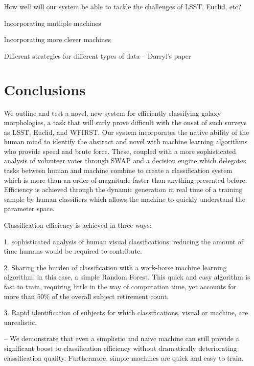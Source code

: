 \documentclass[twocolumn]{aastex6}
\begin{document}
How well will our system be able to tackle the challenges of LSST, Euclid, etc? 

Incorporating mutliple machines

Incorporating more clever machines

Different strategies for different types of data -- Darryl's paper 


\section{Conclusions}

We outline and test a novel, new system for efficiently classifying galaxy morphologies, 
a task that will surly prove difficult with the onset of such surveys as LSST, Euclid, 
and WFIRST. Our system incorporates the native ability of the human mind to identify
the abstract and novel with machine learning algorithms who provide speed and 
brute force. These, coupled with a more sophisticated analysis of volunteer votes 
through SWAP and a decision engine which delegates tasks between human and 
machine combine to create a classification system which is more than an order of
magnitude faster than anything presented before. Efficiency is achieved through 
the dynamic generation in real time of a training sample by human classifiers which
allows the machine to quickly understand the parameter space. 

Classification efficiency is achieved in three ways: 

1. sophisticated analysis of human visual classifications; reducing the amount of time
humans would be required to contribute. 

2. Sharing the burden of classification with a work-horse machine learning algorithm, 
in this case, a simple Random Forest. This quick and easy algorithm is fast to train, 
requiring little in the way of computation time, yet accounts for more than 50\% of 
the overall subject retirement count. 

3. Rapid identification of subjects for which classifications, visual or machine, are
unrealistic. 


-- We demonstrate that even a simplistic and naive machine can still provide a 
significant boost to classification efficiency without dramatically deteriorating 
classification quality. Furthermore, simple machines are quick and easy to train. 
\end{document}
